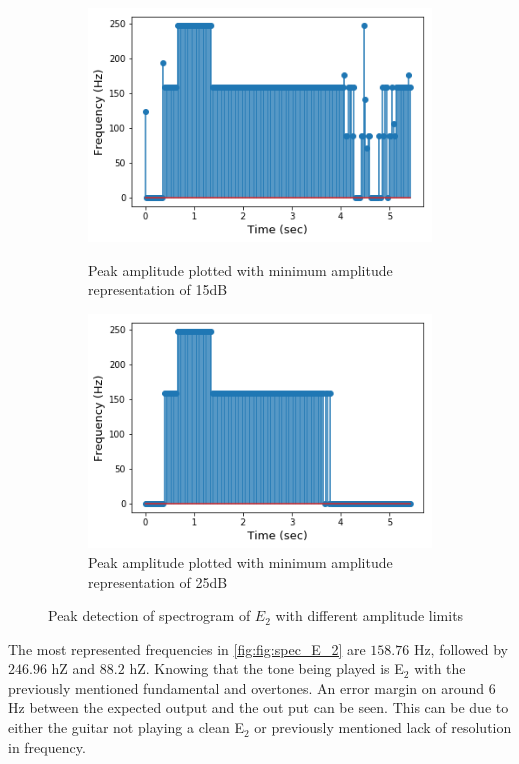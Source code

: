 \begin{figure}[H]
\begin{subfigure}{0.49\textwidth}
\end{subfigure}
\begin{subfigure}{0.49\textwidth}
\centering
\includegraphics[width=\textwidth]{figures/peak_detection/20170511_15.png}
\caption{Peak amplitude plotted with minimum amplitude representation of 15dB}
\label{fig:freq_15dB_Amp_pass}

\includegraphics[width=\textwidth]{figures/peak_detection/20170511_25.png}
\caption{Peak amplitude plotted with minimum amplitude representation of 25dB}
\label{fig:freq_25dB_Amp_pass}

\end{subfigure}
\caption{Peak detection of spectrogram of $E_2$ with different amplitude limits}
\label{fig:valdation_peak_detection}
\end{figure}

The most represented frequencies in \ref{fig:fig:spec_E_2} are $158.76$ Hz, followed by $246.96$ hZ and $88.2$ hZ. 
Knowing that the tone being played is E$_2$ with the previously mentioned fundamental and overtones. 
An error margin on around $6$ Hz between the expected output and the out put can be seen.
This can be due to either the guitar not playing a clean E$_2$ or previously mentioned lack of resolution in frequency.

